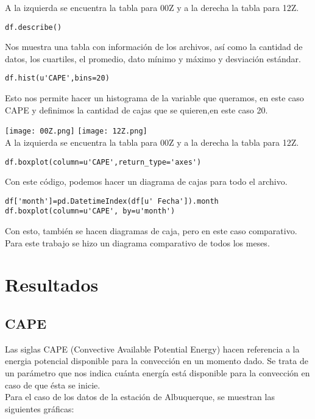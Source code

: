 \documentclass[12pt]{article}
\begin{document}
\begin{doublespace}
\begin{center}
A la izquierda se encuentra la tabla para 00Z y a la derecha la tabla para 12Z.
\end{center}

\begin{verbatim}
df.describe()
\end{verbatim}
Nos muestra una tabla con información de los archivos, así como la cantidad de datos, los cuartiles, el promedio, dato mínimo y máximo y desviación estándar.

\begin{verbatim}
df.hist(u'CAPE',bins=20)
\end{verbatim}
Esto nos permite hacer un histograma de la variable que queramos, en este caso CAPE y definimos la cantidad de cajas que se quieren,en este caso 20. 
\\

\begin{center}
\texttt{[image: 00Z.png]} \texttt{[image: 12Z.png]}
\\
A la izquierda se encuentra la tabla para 00Z y a la derecha la tabla para 12Z.
\end{center}
\begin{verbatim}
df.boxplot(column=u'CAPE',return_type='axes')
\end{verbatim}
Con este código, podemos hacer un diagrama de cajas para todo el archivo.

\begin{verbatim}
df['month']=pd.DatetimeIndex(df[u' Fecha']).month
df.boxplot(column=u'CAPE', by=u'month')
\end{verbatim}
Con esto, también se hacen diagramas de caja, pero en este caso comparativo. Para este trabajo se hizo un diagrama comparativo de todos los meses.

\section{Resultados}
\subsection{CAPE}
Las siglas CAPE (Convective Available Potential Energy) hacen referencia a la energia potencial disponible para la convección en un momento dado. Se trata de un parámetro que nos indica cuánta energía está disponible para la convección en caso de que ésta se inicie.
\\

Para el caso de los datos de la estación de Albuquerque, se muestran las siguientes gráficas:


\end{doublespace}
\end{document}
